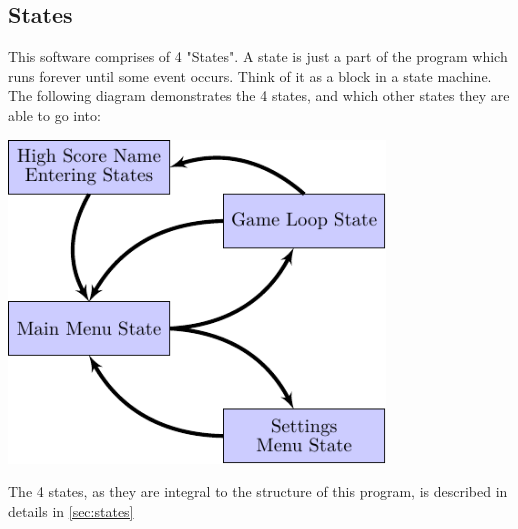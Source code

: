 \documentclass[12pt, a4paper]{article}
\newenvironment{Figure}
  {\par\medskip\noindent\minipage{\linewidth}\centering}
  {\endminipage\par\medskip}
\begin{document}
    \subsection{States} \label{soft:over:states}
    This software comprises of 4 "States". A state is just a part of the program which runs forever until some event occurs. Think of it as a block in a state machine. The following diagram demonstrates the 4 states, and which other states they are able to go into:
    \begin{Figure}\centering\includegraphics[width=0.75\textwidth]{TikzDrawings/gameloops.pdf}\end{Figure}
    The 4 states, as they are integral to the structure of this program, is described in details in \cref{sec:states}
    
\end{document}
